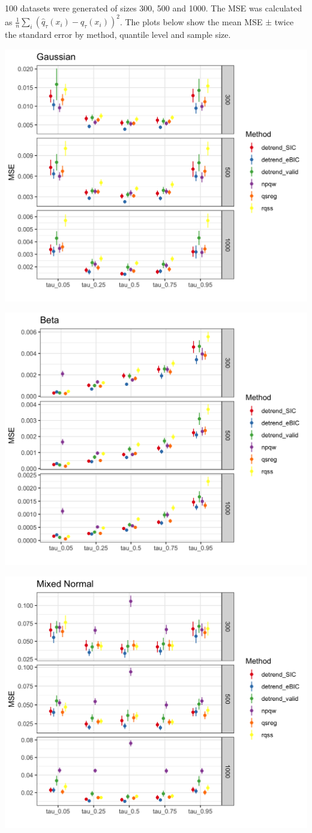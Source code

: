 \documentclass[]{article}
\begin{document}
100 datasets were generated of sizes 300, 500 and 1000. The MSE was calculated as $\frac{1}{n}\sum_i (\hat{q}_{\tau}(x_i) - q_\tau(x_i))^2$. The plots below show the mean MSE $\pm$ twice the standard error by method, quantile level and sample size. 
	 
\includegraphics[width=.6\linewidth]{Figures/gaus_mse.png}	

\includegraphics[width=.6\linewidth]{Figures/shapebeta_mse.png}

\includegraphics[width=.6\linewidth]{Figures/mixednorm_mse.png}
\end{document}
